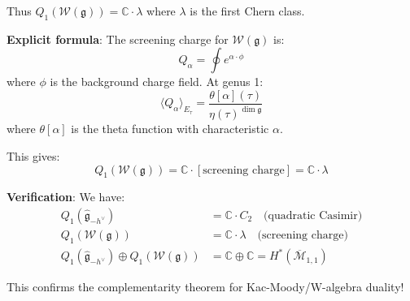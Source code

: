 \begin{example}
Thus $Q_1(\mathcal{W}(\mathfrak{g})) = \mathbb{C} \cdot \lambda$ where $\lambda$ is 
the first Chern class.

\textbf{Explicit formula}: The screening charge for $\mathcal{W}(\mathfrak{g})$ is:
\begin{equation}
Q_\alpha = \oint e^{\alpha \cdot \phi}
\end{equation}
where $\phi$ is the background charge field. At genus 1:
\begin{equation}
\langle Q_\alpha \rangle_{E_\tau} = \frac{\theta[\alpha](\tau)}{\eta(\tau)^{\dim 
\mathfrak{g}}}
\end{equation}
where $\theta[\alpha]$ is the theta function with characteristic $\alpha$.

This gives:
\begin{equation}
Q_1(\mathcal{W}(\mathfrak{g})) = \mathbb{C} \cdot [\text{screening charge}] = 
\mathbb{C} \cdot \lambda
\end{equation}

\textbf{Verification}: We have:
\begin{align}
Q_1(\widehat{\mathfrak{g}}_{-h^\vee}) &= \mathbb{C} \cdot C_2 \quad \text{(quadratic 
Casimir)}\\
Q_1(\mathcal{W}(\mathfrak{g})) &= \mathbb{C} \cdot \lambda \quad \text{(screening 
charge)}\\
Q_1(\widehat{\mathfrak{g}}_{-h^\vee}) \oplus Q_1(\mathcal{W}(\mathfrak{g})) &= 
\mathbb{C} \oplus \mathbb{C} = H^*(\overline{\mathcal{M}}_{1,1})
\end{align}

This confirms the complementarity theorem for Kac-Moody/W-algebra duality!
\end{example}

